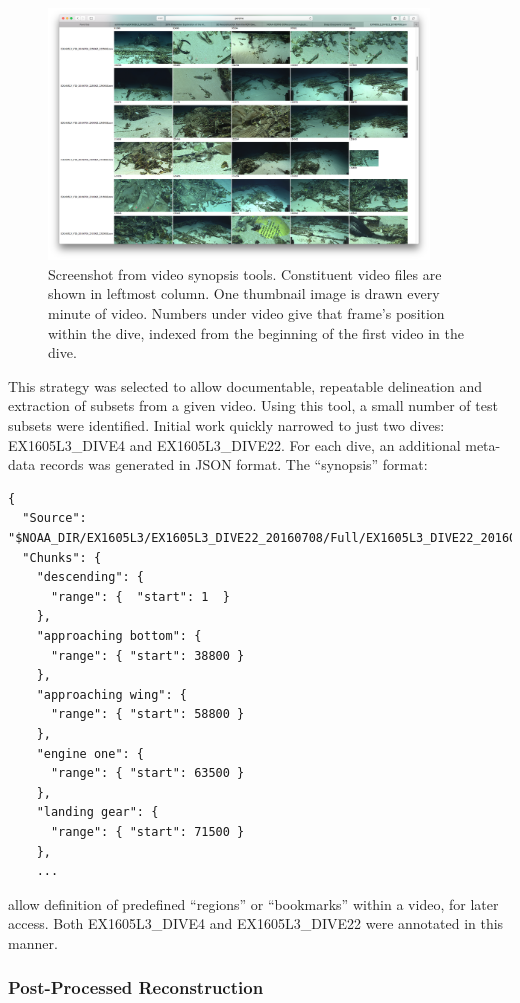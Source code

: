 \documentclass[letterpaper,12pt]{article}
\begin{document}
\begin{figure}
    \centering
    \includegraphics[width=0.9\textwidth]{images/thumbnailer_screenshot.png}
    \caption{Screenshot from video synopsis tools.   Constituent video files are shown in leftmost column.   One thumbnail image is drawn every minute of video.  Numbers under video give that frame's position within the dive, indexed from the beginning of the first video in the dive.}
    \label{img:thumbnails}
\end{figure}

This strategy was selected to allow documentable, repeatable delineation and extraction of subsets from a given video.  Using this tool, a small number of test subsets were identified.   Initial work quickly narrowed to just two dives: EX1605L3\_DIVE4 and EX1605L3\_DIVE22.  For each dive, an additional meta-data records was generated in JSON format.  The ``synopsis'' format:

\begin{Verbatim}[fontsize=\small]
{
  "Source": "$NOAA_DIR/EX1605L3/EX1605L3_DIVE22_20160708/Full/EX1605L3_DIVE22_20160708.json",
  "Chunks": {
    "descending": {
      "range": {  "start": 1  }
    },
    "approaching bottom": {
      "range": { "start": 38800 }
    },
    "approaching wing": {
      "range": { "start": 58800 }
    },
    "engine one": {
      "range": { "start": 63500 }
    },
    "landing gear": {
      "range": { "start": 71500 }
    },
    ...
\end{Verbatim}

allow definition of predefined ``regions'' or ``bookmarks'' within a video, for later access.  Both EX1605L3\_DIVE4 and EX1605L3\_DIVE22 were annotated in this manner.



\subsubsection{Post-Processed Reconstruction}
\end{document}
